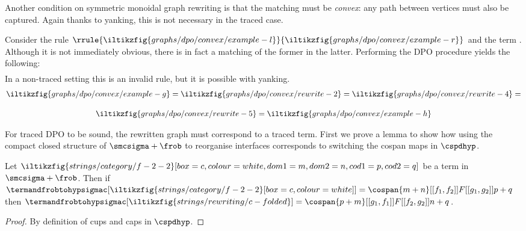 Another condition on symmetric monoidal graph rewriting is that the matching
must be \emph{convex}: any path between vertices must also be captured.
Again thanks to yanking, this is not necessary in the traced case.

\begin{example}
    Consider the rule \(
    \rrule{
        \iltikzfig{graphs/dpo/convex/example-l}
    }{
        \iltikzfig{graphs/dpo/convex/example-r}
    }
    \) and the term .
    Although it is not immediately obvious, there is in fact
    a matching of the former in the latter.
    Performing the DPO procedure yields the following:
    \begin{gather*}
        
    \end{gather*}
    In a non-traced setting this is an invalid rule, but it is possible with
    yanking.
    \begin{gather*}
        \iltikzfig{graphs/dpo/convex/example-g}
        =
        \iltikzfig{graphs/dpo/convex/rewrite-2}
        =
        \iltikzfig{graphs/dpo/convex/rewrite-4}
        =\\[1em]
        \iltikzfig{graphs/dpo/convex/rewrite-5}
        =
        \iltikzfig{graphs/dpo/convex/example-h}
    \end{gather*}
\end{example}

For traced DPO to be sound, the rewritten graph must correspond to a traced
term.
First we prove a lemma to show how using the compact closed structure of
\(\smcsigma + \frob\) to reorganise interfaces corresponds to switching the
cospan maps in \(\cspdhyp\).

\begin{lemma}\label{lem:switch-interfaces}
    Let \(
    \iltikzfig{strings/category/f-2-2}[box=c,colour=white,dom1=m,dom2=n,cod1=p,cod2=q]
    \) be a term in \(\smcsigma + \frob\).
    Then if \(
    \termandfrobtohypsigmac[
        \iltikzfig{strings/category/f-2-2}[box=c,colour=white]
    ]
    =
    \cospan{m + n}[[f_1,f_2]]{F}[[g_1,g_2]]{p + q}
    \) then \(
    \termandfrobtohypsigmac[
        \iltikzfig{strings/rewriting/c-folded}
    ]
    =
    \cospan{p + m}[[g_1,f_1]]{F}[[f_2,g_2]]{n + q}
    \).
\end{lemma}
\begin{proof}
    By definition of cups and caps in \(\cspdhyp\).
\end{proof}

